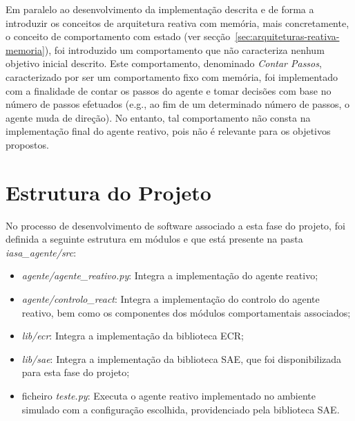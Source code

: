 Em paralelo ao desenvolvimento da implementação descrita e de forma a introduzir os conceitos de arquitetura reativa com memória, mais concretamente, o conceito de comportamento com estado (ver secção~\ref{sec:arquiteturas-reativa-memoria}), foi introduzido um comportamento que não caracteriza nenhum objetivo inicial descrito.
Este comportamento, denominado \textit{Contar Passos}, caracterizado por ser um comportamento fixo com memória, foi implementado com a finalidade de contar os passos do agente e tomar decisões com base no número de passos efetuados (e.g., ao fim de um determinado número de passos, o agente muda de direção).
No entanto, tal comportamento não consta na implementação final do agente reativo, pois não é relevante para os objetivos propostos.


\section{Estrutura do Projeto}\label{sec:estrutura-do-projeto-2}

No processo de desenvolvimento de software associado a esta fase do projeto, foi definida a seguinte estrutura em módulos e que está presente na pasta \textit{iasa\_agente/src}:

\begin{itemize}
    \item \textit{agente/agente\_reativo.py}: Integra a implementação do agente reativo;
    \item \textit{agente/controlo\_react}: Integra a implementação do controlo do agente reativo, bem como os componentes dos módulos comportamentais associados;
    \item \textit{lib/ecr}: Integra a implementação da biblioteca ECR;
    \item \textit{lib/sae}: Integra a implementação da biblioteca SAE, que foi disponibilizada para esta fase do projeto;
    \item ficheiro \textit{teste.py}: Executa o agente reativo implementado no ambiente simulado com a configuração escolhida, providenciado pela biblioteca SAE.
\end{itemize}

